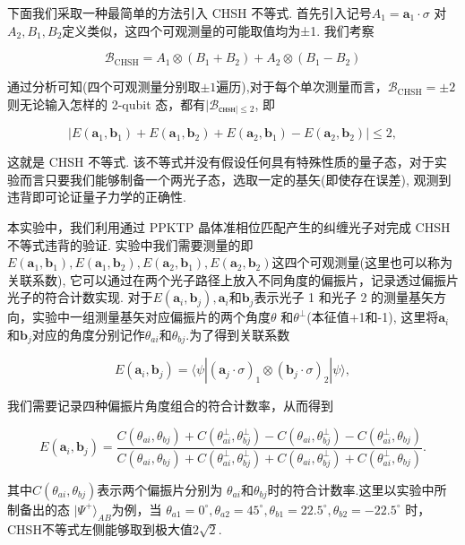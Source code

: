 \documentclass[a4paper,UTF8]{ctexart}
\begin{document}
下面我们采取一种最简单的方法引入 CHSH 不等式. 首先引入记号$A_1=\boldsymbol{a}_1\cdot\sigma$ 对$A_2,B_1,B_2$定义类似，这四个可观测量的可能取值均为±1. 我们考察

$$
\mathcal{B}_{\mathrm{CHSH}}=A_{1}\otimes(B_{1}+B_{2})+A_{2}\otimes(B_{1}-B_{2})
$$

通过分析可知(四个可观测量分别取$\pm1$遍历),对于每个单次测量而言，$\mathcal{B}_{\mathrm{CHSH}}=\pm2$ 则无论输入怎样的 2-qubit 态，都有$|\mathcal{B}_{\text{снsн}|\leq2}$, 即

$$
|E\left(\boldsymbol{a}_1,\boldsymbol{b}_1\right)+E\left(\boldsymbol{a}_1,\boldsymbol{b}_2\right)+E\left(\boldsymbol{a}_2,\boldsymbol{b}_1\right)-E\left(\boldsymbol{a}_2,\boldsymbol{b}_2\right)|\leq2,
$$

这就是 CHSH 不等式. 该不等式并没有假设任何具有特殊性质的量子态，对于实验而言只要我们能够制备一个两光子态，选取一定的基矢(即使存在误差), 观测到违背即可论证量子力学的正确性.

本实验中，我们利用通过 PPKTP 晶体准相位匹配产生的纠缠光子对完成 CHSH 不等式违背的验证. 实验中我们需要测量的即$E(\boldsymbol{a}_1,\boldsymbol{b}_1),E(\boldsymbol{a}_1,\boldsymbol{b}_2),E(\boldsymbol{a}_2,\boldsymbol{b}_1),E(\boldsymbol{a}_2,\boldsymbol{b}_2)$这四个可观测量(这里也可以称为关联系数), 它可以通过在两个光子路径上放入不同角度的偏振片，记录透过偏振片光子的符合计数实现. 对于$E(\boldsymbol{a}_i,\boldsymbol{b}_j),\boldsymbol{a}_i$和$\boldsymbol{b}_j$表示光子 1 和光子 2 的测量基矢方向，实验中一组测量基矢对应偏振片的两个角度$\theta$ 和$\theta^{\perp}$(本征值+1和-1), 这里将$\boldsymbol{a}_i$和$\boldsymbol{b}_j$对应的角度分别记作$\theta_{ai}$和$\theta_{bj}$.为了得到关联系数

$$
E\left(\boldsymbol{a}_i,\boldsymbol{b}_j\right)=\langle\psi|(\boldsymbol{a}_j\cdot\sigma)_1\otimes(\boldsymbol{b}_j\cdot\sigma)_2|\psi\rangle,
$$

我们需要记录四种偏振片角度组合的符合计数率，从而得到

$$
E(\boldsymbol{a}_i,\boldsymbol{b}_j)=\frac{C(\theta_{ai},\theta_{bj})+C(\theta_{ai}^\perp,\theta_{bj}^\perp)-C(\theta_{ai},\theta_{bj}^\perp)-C(\theta_{ai}^\perp,\theta_{bj})}{C(\theta_{ai},\theta_{bj})+C(\theta_{ai}^\perp,\theta_{bj}^\perp)+C(\theta_{ai},\theta_{bj}^\perp)+C(\theta_{ai}^\perp,\theta_{bj})}.
$$

其中$C(\theta_{ai},\theta_{bj})$表示两个偏振片分别为
$\theta_{ai}$和$\theta_{bj}$时的符合计数率.这里以实验中所制备出的态
$|\Psi^+\rangle_{AB}$为例，当
$\theta_{a1}=0^{\circ},\theta_{a2}=45^{\circ},\theta_{b1}=22.5^{\circ},\theta_{b2}=-22.5^{\circ}$
时，CHSH不等式左侧能够取到极大值$2\sqrt{2}$.
\end{document}

